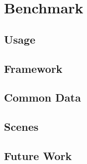 \chapter{Benchmark}

\section{Usage}

\section{Framework}

\section{Common Data}

\section{Scenes}

\section{Future Work}